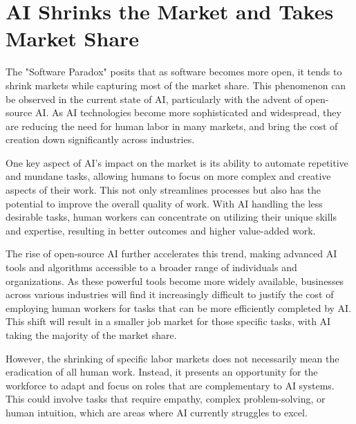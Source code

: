 \begin{marginfigure}[-5.5cm]
    \texttt{[image: waffleburger]}
        \caption{"a delicious cheesebuger made with waffles instead of a bun and covered with rasperry jam" made with Stable Diffusion 2.1}}
        \labfig{waffleburger}
\end{marginfigure}

\section{AI Shrinks the Market and Takes Market Share}

The "Software Paradox" posits that as software becomes more open, it tends to shrink markets while capturing most of the market share. This phenomenon can be observed in the current state of AI, particularly with the advent of open-source AI. As AI technologies become more sophisticated and widespread, they are reducing the need for human labor in many markets, and bring the cost of creation down significantly across industries.

One key aspect of AI's impact on the market is its ability to automate repetitive and mundane tasks, allowing humans to focus on more complex and creative aspects of their work. This not only streamlines processes but also has the potential to improve the overall quality of work. With AI handling the less desirable tasks, human workers can concentrate on utilizing their unique skills and expertise, resulting in better outcomes and higher value-added work.

The rise of open-source AI further accelerates this trend, making advanced AI tools and algorithms accessible to a broader range of individuals and organizations. As these powerful tools become more widely available, businesses across various industries will find it increasingly difficult to justify the cost of employing human workers for tasks that can be more efficiently completed by AI. This shift will result in a smaller job market for those specific tasks, with AI taking the majority of the market share.

However, the shrinking of specific labor markets does not necessarily mean the eradication of all human work. Instead, it presents an opportunity for the workforce to adapt and focus on roles that are complementary to AI systems. This could involve tasks that require empathy, complex problem-solving, or human intuition, which are areas where AI currently struggles to excel.

